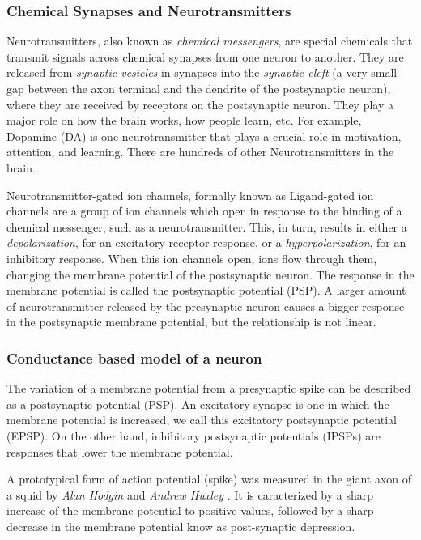 \documentclass{uonmathreport}
\begin{document}
\subsubsection{Chemical Synapses and Neurotransmitters}\label{subsubsec:neurotrans}

Neurotransmitters, also known as \textit{chemical messengers}, are special chemicals that transmit signals across chemical synapses from one neuron to another. They are released from \textit{synaptic vesicles} in synapses into the \textit{synaptic cleft} (a very small gap between the axon terminal and the dendrite of the postsynaptic neuron), where they are received by receptors on the postsynaptic neuron. They play a major role on how the brain works, how people learn, etc. For example, Dopamine (DA) is one neurotransmitter that plays a crucial role in motivation, attention, and learning. There are hundreds of other Neurotransmitters in the brain.

Neurotransmitter-gated ion channels, formally known as Ligand-gated ion channels are a group of ion channels which open in response to the binding of a chemical messenger, such as a neurotransmitter. This, in turn, results in either a \textit{depolarization}, for an excitatory receptor response, or a \textit{hyperpolarization}, for an inhibitory response. When this ion channels open, ions flow through them, changing the membrane potential of the postsynaptic neuron. The response in the membrane potential is called the postsynaptic potential (PSP). A larger amount of neurotransmitter released by the presynaptic neuron causes a bigger response in the postsynaptic membrane potential, but the relationship is not linear.

\subsubsection{Conductance based model of a neuron}\label{subsubsec:conduc_model}

The variation of a membrane potential from a presynaptic spike can be described as a postsynaptic potential (PSP). 
An excitatory synapse is one in which the membrane potential is increased, we call this excitatory postsynaptic potential (EPSP). On the other hand, inhibitory postsynaptic potentials (IPSPs) are responses that lower the membrane potential.

A prototypical form of action potential (spike) was measured in the giant axon of a squid by \textit{Alan Hodgin} and \textit{Andrew Huxley} \cite{hodgkin1952quantitative}. It is caracterized by a sharp increase of the membrane potential to positive values, followed by a sharp decrease in the membrane potential know as post-synaptic depression.
\end{document}
